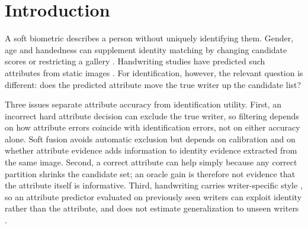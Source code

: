 \documentclass[ASNA,twocolumn]{USG}
\begin{document}
\section{Introduction}
A soft biometric describes a person without uniquely identifying them. Gender, age and handedness can supplement identity matching by changing candidate scores or restricting a gallery \cite{jain2004soft,jain2004integrating,dantcheva2016soft,nixon2015soft}. Handwriting studies have predicted such attributes from static images \cite{liwicki2011gender,siddiqi2015gender,bouadjenek2016soft,almaadeed2016handedness,morera2018handedness,rahmanian2021handedness}. For identification, however, the relevant question is different: does the predicted attribute move the true writer up the candidate list?

Three issues separate attribute accuracy from identification utility. First, an incorrect hard attribute decision can exclude the true writer, so filtering depends on how attribute errors coincide with identification errors, not on either accuracy alone. Soft fusion avoids automatic exclusion but depends on calibration and on whether attribute evidence adds information to identity evidence extracted from the same image. Second, a correct attribute can help simply because any correct partition shrinks the candidate set; an oracle gain is therefore not evidence that the attribute itself is informative. Third, handwriting carries writer-specific style \cite{bulacu2007text,schomaker2007codebooks}, so an attribute predictor evaluated on previously seen writers can exploit identity rather than the attribute, and does not estimate generalization to unseen writers \cite{kaufman2012leakage}.
\end{document}
